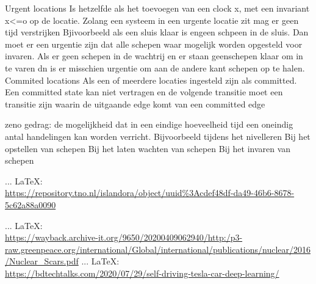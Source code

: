 \begin{thebibliography}{99}
{{{{{{{						
						
						Urgent locations
						Is hetzelfde als het toevoegen van een clock x, met een invariant x<=o op de locatie. Zolang een systeem in een urgente locatie zit mag er geen tijd verstrijken
						Bjivoorbeeld als een sluis klaar is engeen schpeen in de sluis. Dan moet er een urgentie zijn dat alle schepen waar mogelijk worden opgesteld voor invaren. Als er geen schepen in de wachtrij en er staan geenschepen klaar om in te varen dn is er misschien urgentie om aan de andere kant schepen op te halen.
						Commited locations
						Als een of meerdere locaties ingesteld zijn als committed. Een committed state kan niet vertragen  en de volgende transitie moet een transitie zijn waarin de uitgaande edge komt van een committed edge
						
						
						zeno gedrag: de mogelijkheid dat in een eindige hoeveelheid tijd een oneindig antal handelingen kan worden verricht.
						Bijvoorbeeld tijdens het nivelleren
						Bij het opstellen van schepen
						Bij het laten wachten van schepen
						Bij het invaren van schepen
						
						
						
						 ... \LaTeX:\\ \url{https://repository.tno.nl/islandora/object/uuid%3Acdef48df-da49-46b6-8678-5c62a88a0090 }
						
						
						
						
						 ... \LaTeX:\\ \url{https://wayback.archive-it.org/9650/20200409062940/http:/p3-raw.greenpeace.org/international/Global/international/publications/nuclear/2016/Nuclear_Scars.pdf}
						 ... \LaTeX:\\ \url{https://bdtechtalks.com/2020/07/29/self-driving-tesla-car-deep-learning/}
						
}}}}}}}
\end{thebibliography}
